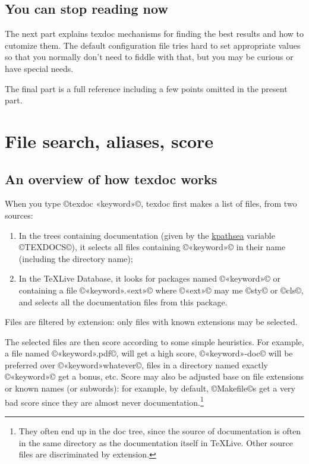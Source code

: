 \documentclass[a4paper, oneside]{scrartcl}
\newcommand\texlive{%
  \TeX\thinspace Live\xspace}
\begin{document}
\subsection{You can stop reading now}

The next part explains texdoc mechanisms for finding the best results and how
to cutomize them. The default configuration file tries hard to set appropriate
values so that you normally don't need to fiddle with that, but you may be
curious or have special needs.

The final part is a full reference including a few points omitted in the
present part.

\clearpage

\section{File search, aliases, score}

\subsection{An overview of how texdoc works}

When you type ©texdoc «keyword»©, texdoc first makes a list of files, from two
sources:
\begin{enumerate}
  \item In the trees containing documentation (given by the
    \href{http://www.tug.org/kpathsea/} {kpathsea} variable ©TEXDOCS©), it
    selects all files containing ©«keyword»© in their name (including the
    directory name);
  \item In the \texlive Database, it looks for packages named
    ©«keyword»© or containing a file ©«keyword».«ext»© where ©«ext»© may me
    ©sty© or ©cls©, and selects all the documentation files from this package.
\end{enumerate}
Files are filtered by extension: only files with known extensions may be
selected.

The selected files are then score according to some simple heuristics. For
example, a file named ©«keyword».pdf©, will get a high score, ©«keyword»-doc©
will be preferred over ©«keyword»whatever©, files in a directory named exactly
©«keyword»© get a bonus, etc. Score may also be adjusted base on file
extensions or known names (or subwords): for example, by default, ©Makefile©s
get a very bad score since they are almost never documentation.\footnote{They
  often end up in the doc tree, since the source of documentation is often in
  the same directory as the documentation itself in \texlive. Other source
  files are discriminated by extension.}
\end{document}
